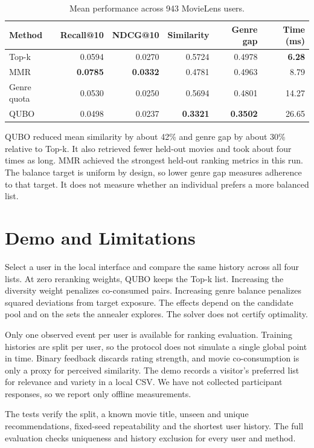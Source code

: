 \documentclass[10pt,a4paper]{article}
\begin{document}
\begin{table}[htbp]
\centering
\caption{Mean performance across 943 MovieLens users.}
\begin{tabular}{lrrrrr}
\toprule
Method & Recall@10 & NDCG@10 & Similarity & Genre gap & Time (ms)\\
\midrule
Top-k       & 0.0594 & 0.0270 & 0.5724 & 0.4978 & \textbf{6.28}\\
MMR         & \textbf{0.0785} & \textbf{0.0332} & 0.4781 & 0.4963 & 8.79\\
Genre quota & 0.0530 & 0.0250 & 0.5694 & 0.4801 & 14.27\\
QUBO        & 0.0498 & 0.0237 & \textbf{0.3321} & \textbf{0.3502} & 26.65\\
\bottomrule
\end{tabular}
\end{table}

QUBO reduced mean similarity by about 42\% and genre gap by about 30\% relative to Top-k. It also retrieved fewer held-out movies and took about four times as long. MMR achieved the strongest held-out ranking metrics in this run. The balance target is uniform by design, so lower genre gap measures adherence to that target. It does not measure whether an individual prefers a more balanced list.

\section{Demo and Limitations}
Select a user in the local interface and compare the same history across all four lists. At zero reranking weights, QUBO keeps the Top-k list. Increasing the diversity weight penalizes co-consumed pairs. Increasing genre balance penalizes squared deviations from target exposure. The effects depend on the candidate pool and on the sets the annealer explores. The solver does not certify optimality.

Only one observed event per user is available for ranking evaluation. Training histories are split per user, so the protocol does not simulate a single global point in time. Binary feedback discards rating strength, and movie co-consumption is only a proxy for perceived similarity. The demo records a visitor's preferred list for relevance and variety in a local CSV. We have not collected participant responses, so we report only offline measurements.

The tests verify the split, a known movie title, unseen and unique recommendations, fixed-seed repeatability and the shortest user history. The full evaluation checks uniqueness and history exclusion for every user and method.
\end{document}
